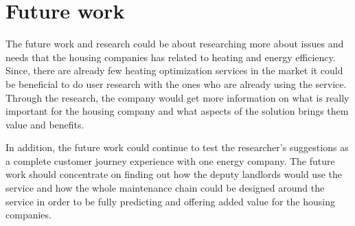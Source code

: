 \section{Future work}

The future work and research could be about researching more about issues and needs that the housing companies has related to heating and energy efficiency. Since, there are already few heating optimization services in the market it could be beneficial to do user research with the ones who are already using the service. Through the research, the company would get more information on what is really important for the housing company and what aspects of the solution brings them value and benefits.

In addition, the future work could continue to test the researcher's suggestions as a complete customer journey experience with one energy company. The future work should concentrate on finding out how the deputy landlords would use the service and how the whole maintenance chain could be designed around the service in order to be fully predicting and offering added value for the housing companies.